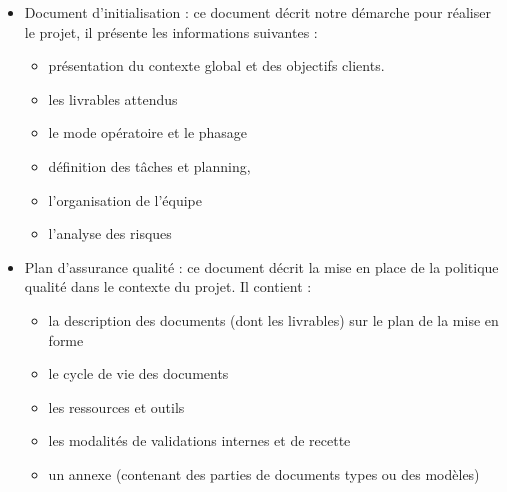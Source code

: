 \begin{itemize}
    \item Document d’initialisation : ce document décrit notre démarche pour réaliser le projet, il présente les informations suivantes :
    \begin{itemize}
        \item présentation du contexte global et des objectifs clients.
        \item les livrables attendus
        \item le mode opératoire et le phasage
        \item définition des tâches et planning,
        \item l’organisation de l’équipe
        \item l’analyse des risques
    \end{itemize}
    \item Plan d’assurance qualité : ce document décrit la mise en place de la politique qualité dans le contexte du projet. Il contient :
    \begin{itemize}
        \item la description des documents (dont les livrables) sur le plan de la mise en forme
        \item le cycle de vie des documents
        \item les ressources et outils
        \item les modalités de validations internes et de recette
        \item un annexe (contenant des parties de documents types ou des modèles)
    \end{itemize}
\end{itemize}

